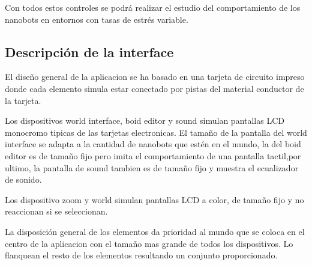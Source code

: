 Con todos estos controles se podrá realizar el estudio del comportamiento de los nanobots en entornos con tasas de estrés variable.

\subsection{Descripción de la interface}
\label{sec:descricion_interface}
El diseño general de la aplicacion se ha basado en una tarjeta de circuito impreso donde cada elemento simula estar conectado por pistas del material conductor de la tarjeta.

Los dispositivos world interface, boid editor y sound  simulan pantallas LCD monocromo tipicas de las tarjetas electronicas. El tamaño de la pantalla del world interface se adapta a la cantidad de nanobots que estén en el mundo, la del boid editor es de tamaño fijo pero imita el comportamiento de una pantalla tactil,por ultimo, la pantalla de sound tambien es de tamaño fijo y muestra el ecualizador de sonido.

Los dispositivo zoom y world simulan pantallas LCD a color, de tamaño fijo y no reaccionan si se seleccionan. 

La disposición general de los elementos da prioridad al mundo que se coloca en el centro de la aplicacion con el tamaño mas grande de todos los dispositivos. Lo flanquean el resto de los elementos resultando un conjunto proporcionado.